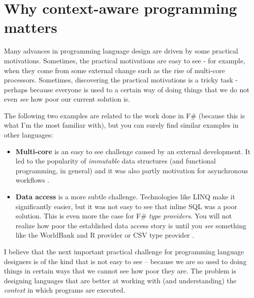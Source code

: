 \chapter{Why context-aware programming matters} 
\label{ch:introduction1} 



Many advances in programming language design are driven by some practical motivations.
Sometimes, the practical motivations are easy to see - for example, when they come from
some external change such as the rise of multi-core processors. Sometimes, discovering 
the practical motivations is a tricky task - perhaps because everyone is used to a 
certain way of doing things that we do not even \emph{see} how poor our current solution is. 

The following two examples are related to the work done in F\# (because this is what
I'm the most familiar with), but you can surely find similar examples in other languages:

\begin{itemize}
\item \textbf{Multi-core} is an easy to see challenge caused by an external development. 
   It led to the popularity of \emph{immutable} data structures (and functional programming,
   in general) and it was also partly motivation for asynchronous workflows \cite{xx}.

\item \textbf{Data access} is a more subtle challenge. Technologies like LINQ \cite{xx} make it
   significantly easier, but it was not easy to see that inline SQL was a poor solution.
   This is even more the case for F\# \emph{type providers}. You will not realize how poor the
   established data access story is until you \emph{see} something like 
   the WorldBank and R provider \cite{xx} or CSV type provider \cite{xx}.
\end{itemize}

I believe that the next important practical challenge for programming language designers
is of the kind that is not easy to see -- because we are so used to doing things in 
certain ways that we cannot see how poor they are. The problem is designing languages
that are better at working with (and understanding) the \emph{context} in which programs are
executed.

